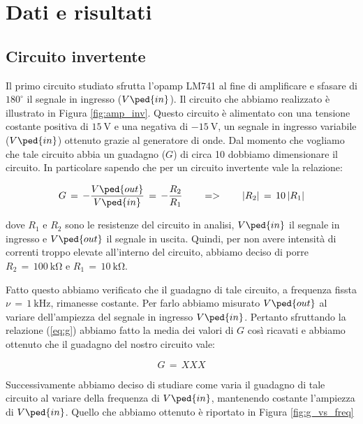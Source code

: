 \section*{Dati e risultati}

\subsection*{Circuito invertente}

Il primo circuito studiato sfrutta l'opamp LM741 al fine di amplificare e sfasare di $180^\circ$ il segnale in ingresso ($V\ped{in}$). Il circuito che abbiamo realizzato è illustrato in Figura \ref{fig:amp_inv}.
Questo circuito è alimentato con una tensione costante positiva di $\SI{+15}{\volt}$ e una negativa di $\SI{-15}{\volt}$, un segnale in ingresso variabile ($V\ped{in}$) ottenuto grazie al generatore di onde.
Dal momento che vogliamo che tale circuito abbia un guadagno ($G$) di circa 10 dobbiamo dimensionare il circuito. In particolare sapendo che per un circuito invertente vale la relazione:

\begin{equation}
        G\,=\,-\frac{V\ped{out}}{V\ped{in}}\,=\,-\frac{R_2}{R_1} \qquad => \qquad |R_2|\,=\,10\,|R_1|
        \label{eq:g}
\end{equation}

dove $R_1$ e $R_2$ sono le resistenze del circuito in analisi, $V\ped{in}$ il segnale in ingresso e $V\ped{out}$ il segnale in uscita. Quindi, per non avere intensità di correnti troppo elevate all'interno del circuito, abbiamo deciso di porre $R_2\,=\,\SI{100}{\kilo\ohm}$ e $R_1\,=\,\SI{10}{\kilo\ohm}$.

Fatto questo abbiamo verificato che il guadagno di tale circuito, a frequenza fissta $\nu\,=\,\SI{1}{\kilo\hertz}$, rimanesse costante. Per farlo abbiamo misurato $V\ped{out}$ al variare dell'ampiezza del segnale in ingresso $V\ped{in}$. Pertanto sfruttando la relazione (\ref{eq:g}) abbiamo fatto la media dei valori di $G$ così ricavati e abbiamo ottenuto che il guadagno del nostro circuito vale:

\begin{equation}
        G\,=\, XXX
\end{equation}

Successivamente abbiamo deciso di studiare come varia il guadagno di tale circuito al variare della frequenza di $V\ped{in}$, mantenendo costante l'ampiezza di $V\ped{in}$. Quello che abbiamo ottenuto è riportato in Figura \ref{fig:g_vs_freq}


